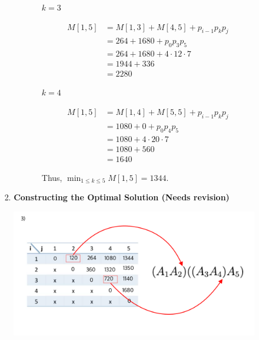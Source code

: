 \documentclass[12pt]{article}
\begin{document}
\begin{enumerate}[1.]
\begin{itemize}
\begin{itemize}
\begin{enumerate}[1.]
\begin{enumerate}[1)]
\begin{itemize}
                        \bigskip

                        \underline{$k = 3$}

                        \begin{align}
                            M[1,5] &= M[1,3] + M[4,5] + p_{i-1}p_kp_j\\
                            &= 264 + 1680 + p_0p_3p_5\\
                            &= 264 + 1680 + 4 \cdot 12 \cdot 7\\
                            &= 1944 + 336\\
                            &= 2280
                        \end{align}

                        \bigskip

                        \underline{$k = 4$}

                        \begin{align}
                            M[1,5] &= M[1,4] + M[5,5] + p_{i-1}p_kp_j\\
                            &= 1080 + 0 + p_0p_4p_5\\
                            &= 1080 + 4 \cdot 20 \cdot 7\\
                            &= 1080 + 560\\
                            &= 1640
                        \end{align}

                        \bigskip

                        Thus, $\min_{1 \leq k \leq 5} M[1,5] = 1344$.

                    \end{itemize}


                \end{enumerate}

                \item \textbf{Constructing the Optimal Solution (Needs revision)}

                \bigskip

                \begin{center}
                \includegraphics[width=\linewidth]{images/worksheet_3_solution_5.png}
                \end{center}


\end{enumerate}
\end{itemize}
\end{itemize}
\end{enumerate}
\end{document}
